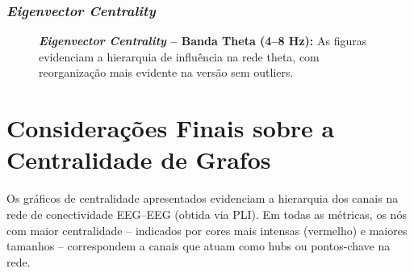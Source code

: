 \subsubsection{\textit{Eigenvector Centrality}}
\begin{figure}[H]
    \centering
    \hfill
    \caption{\small \textbf{\textit{Eigenvector Centrality} – Banda Theta (4--8 Hz):} As figuras evidenciam a hierarquia de influência na rede theta, com reorganização mais evidente na versão sem outliers.}
    \label{fig:eigenvector_theta}
\end{figure}

\section{Considerações Finais sobre a Centralidade de Grafos}
Os gráficos de centralidade apresentados evidenciam a hierarquia dos canais na rede de conectividade EEG–EEG (obtida via PLI). Em todas as métricas, os nós com maior centralidade – indicados por cores mais intensas (vermelho) e maiores tamanhos – correspondem a canais que atuam como hubs ou pontos-chave na rede. 

